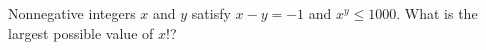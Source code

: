 Nonnegative integers $x$ and $y$ satisfy $x-y=-1$ and $x^y\le1000$. What is the largest possible value of $x!$?

